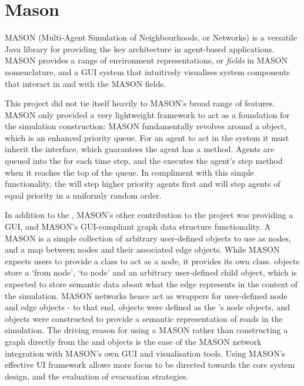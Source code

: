 \section{Mason}

MASON (Multi-Agent Simulation of Neighbourhoods, or Networks) is a versatile Java library for providing the key architecture in agent-based applications. MASON provides a range of environment representations, or \textit{fields} in MASON nomenclature, and a GUI system that intuitively visualises system components that interact in and with the MASON fields.

This project did not tie itself heavily to MASON's broad range of features. MASON only provided a very lightweight framework to act as a foundation for the simulation construction: MASON fundamentally revolves around a  object, which is an enhanced priority queue. For an agent to act in the system it must inherit the  interface, which guarantees the agent has a  method. Agents are queued into the  for each time step, and the  executes the agent's step method when it reaches the top of the queue. In compliment with this simple functionality, the  will step higher priority agents first and will step agents of equal priority in a uniformly random order.

In addition to the , MASON's other contribution to the project was providing a GUI, and MASON's GUI-compliant graph data structure functionality. A MASON  is a simple collection of arbitrary user-defined objects to use as nodes, and a map between nodes and their associated edge objects. While MASON expects users to provide a class to act as a node, it provides its own  class.  objects store a `from node', `to node' and an arbitrary user-defined child object, which is expected to store semantic data about what the edge represents in the context of the simulation. MASON networks hence act as wrappers for user-defined node and edge objects - to that end,  objects were defined as the 's node objects, and  objects were constructed to provide a semantic representation of roads in the simulation. The driving reason for using a MASON  rather than constructing a graph directly from the  and  objects is the ease of the MASON network integration with MASON's own GUI and visualisation tools. Using MASON's effective UI framework allows more focus to be directed towards the core system design, and the evaluation of evacuation strategies.


